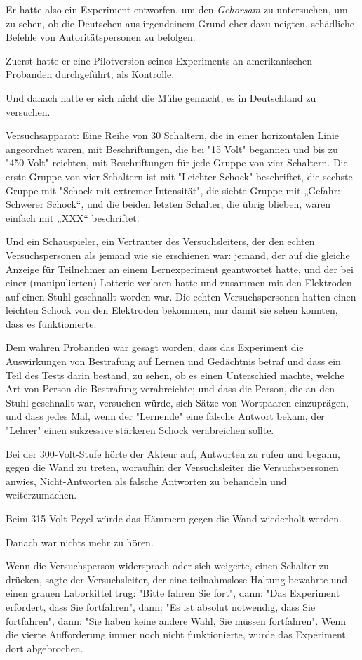 {Er hatte also ein Experiment entworfen, um den \emph{Gehorsam} zu untersuchen, um zu sehen, ob die Deutschen aus irgendeinem Grund eher dazu neigten, schädliche Befehle von Autoritätspersonen zu befolgen.

Zuerst hatte er eine Pilotversion seines Experiments an amerikanischen Probanden durchgeführt, als Kontrolle.

Und danach hatte er sich nicht die Mühe gemacht, es in Deutschland zu versuchen.

Versuchsapparat: Eine Reihe von 30 Schaltern, die in einer horizontalen Linie angeordnet waren, mit Beschriftungen, die bei "15 Volt" begannen und bis zu "450 Volt" reichten, mit Beschriftungen für jede Gruppe von vier Schaltern. Die erste Gruppe von vier Schaltern ist mit "Leichter Schock" beschriftet, die sechste Gruppe mit "Schock mit extremer Intensität", die siebte Gruppe mit „Gefahr: Schwerer Schock“, und die beiden letzten Schalter, die übrig blieben, waren einfach mit „XXX“ beschriftet.

Und ein Schauspieler, ein Vertrauter des Versuchsleiters, der den echten Versuchspersonen als jemand wie sie erschienen war: jemand, der auf die gleiche Anzeige für Teilnehmer an einem Lernexperiment geantwortet hatte, und der bei einer (manipulierten) Lotterie verloren hatte und zusammen mit den Elektroden auf einen Stuhl geschnallt worden war. Die echten Versuchspersonen hatten einen leichten Schock von den Elektroden bekommen, nur damit sie sehen konnten, dass es funktionierte.

Dem wahren Probanden war gesagt worden, dass das Experiment die Auswirkungen von Bestrafung auf Lernen und Gedächtnis betraf und dass ein Teil des Tests darin bestand, zu sehen, ob es einen Unterschied machte, welche Art von Person die Bestrafung verabreichte; und dass die Person, die an den Stuhl geschnallt war, versuchen würde, sich Sätze von Wortpaaren einzuprägen, und dass jedes Mal, wenn der "Lernende" eine falsche Antwort bekam, der "Lehrer" einen sukzessive stärkeren Schock verabreichen sollte.

Bei der 300-Volt-Stufe hörte der Akteur auf, Antworten zu rufen und begann, gegen die Wand zu treten, woraufhin der Versuchsleiter die Versuchspersonen anwies, Nicht-Antworten als falsche Antworten zu behandeln und weiterzumachen.

Beim 315-Volt-Pegel würde das Hämmern gegen die Wand wiederholt werden.

Danach war nichts mehr zu hören.

Wenn die Versuchsperson widersprach oder sich weigerte, einen Schalter zu drücken, sagte der Versuchsleiter, der eine teilnahmslose Haltung bewahrte und einen grauen Laborkittel trug: "Bitte fahren Sie fort", dann: "Das Experiment erfordert, dass Sie fortfahren", dann: "Es ist absolut notwendig, dass Sie fortfahren", dann: "Sie haben keine andere Wahl, Sie müssen fortfahren". Wenn die vierte Aufforderung immer noch nicht funktionierte, wurde das Experiment dort abgebrochen.

}
